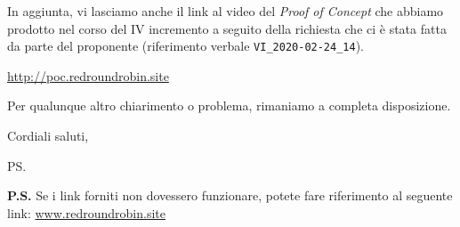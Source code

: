 \documentclass[12pt]{letter}
\begin{document}
\begin{letter}{ }
In aggiunta, vi lasciamo anche il link al video del \textit{Proof of Concept} che abbiamo prodotto nel corso del IV incremento a seguito della richiesta che ci è stata fatta da parte del proponente (riferimento verbale \verb!VI_2020-02-24_14!).

\begin{center}
	\href{http://poc.redroundrobin.site/}{http://poc.redroundrobin.site}
\end{center}


Per qualunque altro chiarimento o problema, rimaniamo a completa disposizione.

\closing{Cordiali saluti,}


\vspace{3em}
\ps

\textbf{P.S.} Se i link forniti non dovessero funzionare, potete fare riferimento al seguente link:
\href{https://www.redroundrobin.site}{www.redroundrobin.site}

\end{letter}
\end{document}
